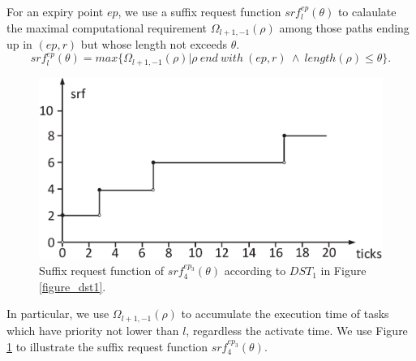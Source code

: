 \documentclass[sigconf]{acmart}
\begin{document}
\begin{definition}
For an expiry point $ep$, we use a suffix request function $srf^{ep}_{l}(\theta)$ to calaulate the maximal computational requirement $\Omega_{l+1,-1}(\rho)$ among those paths ending up in $(ep,r)$ but whose length not exceeds $\theta$.
\begin{equation}
srf^{ep}_l(\theta)=max\{\Omega_{l+1,-1}(\rho)|\rho\ end\ with\ (ep,r)\ \wedge\ length(\rho)\leq \theta\}.
\end{equation}\label{equation_srf}
\end{definition}
\begin{figure}[t]
  \centering
  \includegraphics[scale=0.31]{graphics/figure_srf.eps}
  \caption{Suffix request function of $srf^{ep_3}_{4}(\theta)$ according to $DST_1$ in Figure \ref{figure_dst1}.} 
  \label{figure_srf}
\end{figure}

In particular, we use $\Omega_{l+1,-1}(\rho)$ to accumulate the execution time of tasks which have priority not lower than $l$, regardless the activate time. We use Figure \ref{figure_srf} to illustrate the suffix request function $srf^{ep_3}_{4}(\theta)$.


\end{document}
